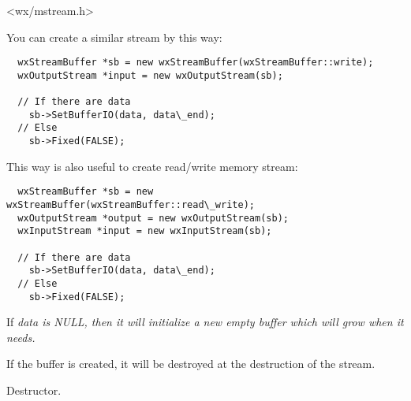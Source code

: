 

<wx/mstream.h>




You can create a similar stream by this way:

\begin{verbatim}
  wxStreamBuffer *sb = new wxStreamBuffer(wxStreamBuffer::write);
  wxOutputStream *input = new wxOutputStream(sb);

  // If there are data
    sb->SetBufferIO(data, data\_end);
  // Else
    sb->Fixed(FALSE);
\end{verbatim}

This way is also useful to create read/write memory stream:

\begin{verbatim}
  wxStreamBuffer *sb = new wxStreamBuffer(wxStreamBuffer::read\_write);
  wxOutputStream *output = new wxOutputStream(sb);
  wxInputStream *input = new wxInputStream(sb);

  // If there are data
    sb->SetBufferIO(data, data\_end);
  // Else
    sb->Fixed(FALSE);
\end{verbatim}




If \it{data} is NULL, then it will initialize a new empty buffer which will
grow when it needs.


If the buffer is created, it will be destroyed at the destruction of the
stream.



Destructor.

